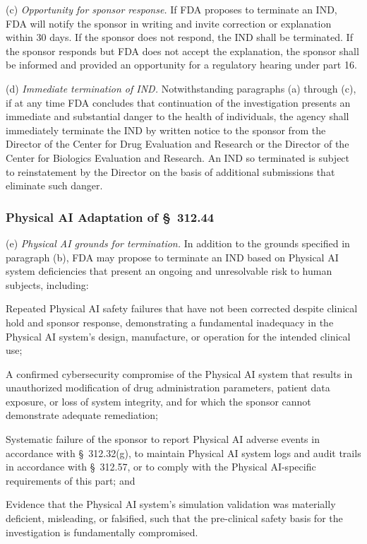 \documentclass[11pt]{article}
\begin{document}
(c) \textit{Opportunity for sponsor response.} If FDA proposes to terminate an IND, FDA will notify the sponsor in writing and invite correction or explanation within 30 days. If the sponsor does not respond, the IND shall be terminated. If the sponsor responds but FDA does not accept the explanation, the sponsor shall be informed and provided an opportunity for a regulatory hearing under part 16.

(d) \textit{Immediate termination of IND.} Notwithstanding paragraphs (a) through (c), if at any time FDA concludes that continuation of the investigation presents an immediate and substantial danger to the health of individuals, the agency shall immediately terminate the IND by written notice to the sponsor from the Director of the Center for Drug Evaluation and Research or the Director of the Center for Biologics Evaluation and Research. An IND so terminated is subject to reinstatement by the Director on the basis of additional submissions that eliminate such danger.

\subsubsection{Physical AI Adaptation of \S~312.44}

(e) \textit{Physical AI grounds for termination.} In addition to the grounds specified in paragraph (b), FDA may propose to terminate an IND based on Physical AI system deficiencies that present an ongoing and unresolvable risk to human subjects, including:

\begin{description}[leftmargin=0.8cm,style=sameline]
\item[(i)] Repeated Physical AI safety failures that have not been corrected despite clinical hold and sponsor response, demonstrating a fundamental inadequacy in the Physical AI system's design, manufacture, or operation for the intended clinical use;
\item[(ii)] A confirmed cybersecurity compromise of the Physical AI system that results in unauthorized modification of drug administration parameters, patient data exposure, or loss of system integrity, and for which the sponsor cannot demonstrate adequate remediation;
\item[(iii)] Systematic failure of the sponsor to report Physical AI adverse events in accordance with \S~312.32(g), to maintain Physical AI system logs and audit trails in accordance with \S~312.57, or to comply with the Physical AI-specific requirements of this part; and
\item[(iv)] Evidence that the Physical AI system's simulation validation was materially deficient, misleading, or falsified, such that the pre-clinical safety basis for the investigation is fundamentally compromised.
\end{description}
\end{document}
